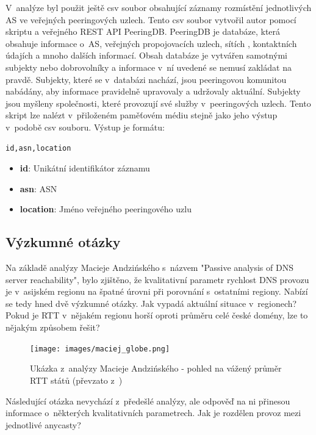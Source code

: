 \documentclass[thesis=M,czech]{src/FITthesis}[2019/12/23]
\begin{document}
V~analýze byl použit ještě csv soubor obsahující záznamy rozmístění jednotlivých AS ve veřejných peeringových uzlech. Tento csv soubor vytvořil autor pomocí skriptu a veřejného REST API PeeringDB. PeeringDB je databáze, která obsahuje informace o~AS, veřejných propojovacích uzlech, sítích , kontaktních údajích a mnoho dalších informací. Obsah databáze je vytvářen samotnými subjekty nebo dobrovolníky a informace v~ní uvedené se nemusí zakládat na pravdě. Subjekty, které se v~databázi nachází, jsou peeringovou komunitou nabádány, aby informace pravidelně upravovaly a udržovaly aktuální. Subjekty jsou myšleny společnosti, které provozují své služby v~peeringových uzlech. Tento skript lze nalézt v~přiloženém paměťovém médiu stejně jako jeho výstup v~podobě csv souboru. Výstup je formátu: 

\begin{verbatim}
id,asn,location
\end{verbatim}

\begin{itemize}
	\item \textbf{id}: Unikátní identifikátor záznamu
	\item \textbf{asn}: ASN 
	\item \textbf{location}: Jméno veřejného peeringového uzlu
\end{itemize}



\subsection{Výzkumné otázky}
Na základě analýzy Macieje Andzińského s~názvem "Passive analysis of DNS server reachability", bylo zjištěno, že kvalitativní parametr rychlost DNS provozu je v~asijském regionu na špatné úrovni při porovnání s~ostatními regiony. Nabízí se tedy hned dvě výzkumné otázky. Jak vypadá aktuální situace v~regionech? Pokud je RTT v~nějakém regionu horší oproti průměru celé české domény, lze to nějakým způsobem řešit? 

\begin{figure}[ht]
  \centering
   \texttt{[image: images/maciej\_globe.png]}
   \caption{Ukázka z~analýzy Macieje Andzińského - pohled na vážený průměr RTT států (převzato z~\cite{cznic-maciej})}
     \label{fig:rttTCP}
\end{figure}

Následující otázka nevychází z~předešlé analýzy, ale odpověď na ni přinesou informace o~některých kvalitativních parametrech. Jak je rozdělen provoz mezi jednotlivé anycasty?
\end{document}
